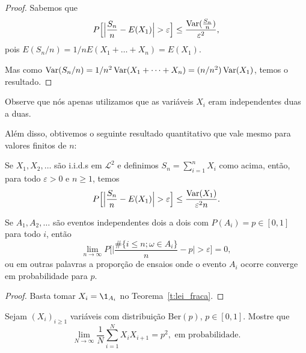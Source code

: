 \begin{proof}
  Sabemos que
  \begin{equation}
    P \Big[\Big| \frac{S_n}{n} - E(X_1)\Big| > \varepsilon \Big] \leq \frac{\operatorname{Var}(\tfrac{S_n}{n})}{\varepsilon^2},
  \end{equation}
  pois $E(S_n/n) = 1/n E(X_1 + \dots + X_n) = E(X_1)$.

  Mas como $\operatorname{Var}(S_n/n) = 1/n^2 \operatorname{Var} (X_1 + \dots + X_n) = (n/n^2) \operatorname{Var}(X_1)$, temos o resultado.
\end{proof}

Observe que nós apenas utilizamos que as variáveis $X_i$ eram independentes duas a duas.

Além disso, obtivemos o seguinte resultado quantitativo que vale mesmo para valores finitos de $n$:

\begin{scholia}
  Se $X_1, X_2, \dots$ são i.i.d.s em $\mathcal{L}^2$ e definimos $S_n = \sum_{i=1}^n X_i$ como acima, então, para todo $\varepsilon > 0$ e $n \geq 1$, temos
  \begin{equation}
    P \Big[\Big| \frac{S_n}{n} - E(X_1)\Big| > \varepsilon \Big] \leq \frac{\operatorname{Var}(X_1)}{\varepsilon^2 n}.
  \end{equation}
\end{scholia}





\begin{corollary}
  Se $A_1, A_2, \dots$ são eventos independentes dois a dois com $P(A_i) = p \in [0,1]$ para todo $i$, então
  \begin{equation}
    \lim_{n \to \infty} P \Big[ \Big| \frac{\#\{i \leq n; \omega \in A_i\}}{n} - p \Big| > \varepsilon \Big] = 0,
  \end{equation}
  ou em outras palavras a proporção de ensaios onde o evento $A_i$ ocorre converge em probabilidade para $p$.
\end{corollary}

\begin{proof}
  Basta tomar $X_i = \1_{A_i}$ no Teorema~\ref{t:lei_fraca}.
\end{proof}

\begin{exercise}
  Sejam $(X_i)_{i \geq 1}$ variáveis \iid com distribui\c{c}\~ao Ber$(p)$, $p \in [0,1]$. Mostre que
  \begin{equation}
    \lim_{N \to \infty} \frac 1N \sum_{i = 1}^N X_i X_{i+1} = p^2, \text{ em probabilidade.}
  \end{equation}
\end{exercise}

